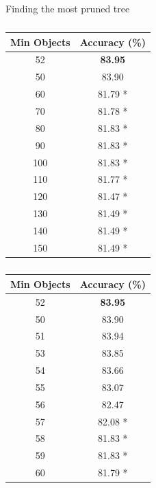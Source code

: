 \documentclass[12pt]{article}
\begin{document}
      \singlespacing
      \begin{table}[H]
        \caption{Finding the most pruned tree}
        \begin{subtable}{.5\linewidth}
          \centering
          \caption{}
          \begin{tabular}{c|c}
            \toprule
            \multicolumn{1}{l|}{Min Objects} & \multicolumn{1}{l}{Accuracy (\%)} \\
            \midrule
            52    & \textbf{83.95} \\
            \midrule
            50    & 83.90 \\
            60    & 81.79 * \\
            70    & 81.78 * \\
            80    & 81.83 * \\
            90    & 81.83 * \\
            100   & 81.83 * \\
            110   & 81.77 * \\
            120   & 81.47 * \\
            130   & 81.49 * \\
            140   & 81.49 * \\
            150   & 81.49 * \\
            \bottomrule
          \end{tabular}
        \label{tab:dt-minobj-prun-a}
        \end{subtable}
        \begin{subtable}{.5\linewidth}
          \centering
          \caption{}
          \begin{tabular}{c|c}
            \toprule
            \multicolumn{1}{l|}{Min Objects} & \multicolumn{1}{l}{Accuracy (\%)} \\
            \midrule
            52    & \textbf{83.95} \\
            \midrule
            50    & 83.90 \\
            51    & 83.94 \\
            53    & 83.85 \\
            54    & 83.66 \\
            55    & 83.07 \\
            56    & 82.47 \\
            57    & 82.08 * \\
            58    & 81.83 * \\
            59    & 81.83 * \\
            60    & 81.79 * \\
            \bottomrule
          \end{tabular}
          \label{tab:dt-minobj-prun-b}
        \end{subtable}
        \label{tab:dt-minobj-prun}
      \end{table}
      \doublespacing
\end{document}

